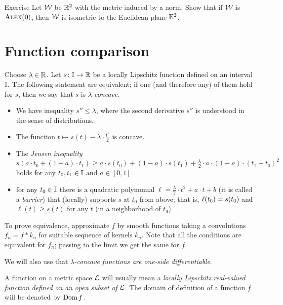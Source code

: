 \begin{thm}{Exercise}\label{ex:normCBB}
Let $\mathcal{W}$ be $\mathbb{R}^2$ with the metric induced by a norm.
Show that if $\mathcal{W}$ is $\textsc{Alex}(0)$, then $\mathcal{W}$ is isometric to the Euclidean plane $\mathbb{E}^2$.
\end{thm}

\section{Function comparison}\label{Function comparison}

Choose $\lambda\in \mathbb{R}$.
Let $s\colon\mathbb{I}\to\mathbb{R}$ be a locally Lipschitz function defined on an interval $\mathbb{I}$.
The following statement are equivalent;
if one (and therefore any) of them hold for $s$, then we say that $s$ is \emph{$\lambda$-concave}.
\begin{itemize}
\item We have inequality $s''\le \lambda$, where the second derivative $s''$ is understood in the sense of distributions.
\item The function $t\mapsto s(t)-\lambda\cdot\tfrac{t^2}2$ is concave.
\item The \emph{Jensen inequality}
\[s(a\cdot t_0+(1-a)\cdot t_1)\ge a\cdot s(t_0)+(1-a)\cdot s(t_1)+\tfrac\lambda2\cdot a\cdot(1-a)\cdot(t_1-t_0)^2 \]
holds for any $t_0,t_1\in \mathbb{I}$ and $a\in[0,1]$.
\item for any $t_0\in \mathbb{I}$ there is a quadratic polynomial $\ell=\tfrac\lambda2\cdot t^2+a\cdot t+b$ (it is called a \emph{barrier}) that (locally) supports $s$ at $t_0$ from above;
that is, $\ell(t_0)\z= s(t_0)$ and $\ell(t)\ge s(t)$ for any $t$ (in a neighborhood of $t_0$)
\end{itemize}

To prove equivalence, approximate $f$ by smooth functions taking a convolutions $f_n=f*k_n$ for suitable sequence of kernels $k_n$.
Note that all the conditions are equivalent for $f_n$;
passing to the limit we get the same for $f$.

We will also use that \textit{$\lambda$-concave functions are one-side differentiable}.

A function on a metric space $\mathcal{L}$ will usually mean a \textit{locally Lipschitz real-valued function defined on an open subset of $\mathcal{L}$}.
The domain of definition of a function $f$ will be denoted by $\mathop{\rm Dom}\nolimits f$.


